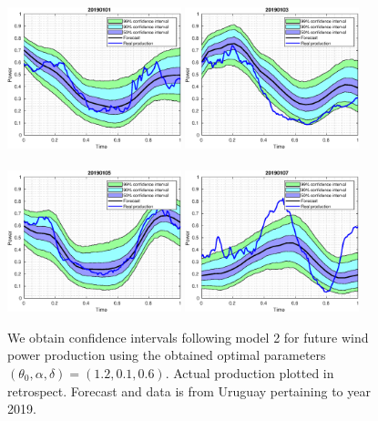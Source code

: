 \documentclass[11pt]{article}
\theoremstyle{definition}
\begin{document}
\begin{figure}[H]
\centering
\includegraphics[width=0.45\textwidth]{../../MATLAB_Files/Results/bands_testing_days/optimal_value/1.eps}
\includegraphics[width=0.45\textwidth]{../../MATLAB_Files/Results/bands_testing_days/optimal_value/2.eps}\\
\quad\\
\includegraphics[width=0.45\textwidth]{../../MATLAB_Files/Results/bands_testing_days/optimal_value/3.eps}
\includegraphics[width=0.45\textwidth]{../../MATLAB_Files/Results/bands_testing_days/optimal_value/4.eps}
\caption{We obtain confidence intervals following model 2  for future wind power production using the obtained optimal parameters $(\theta_0, \alpha ,\delta)=(1.2,0.1,0.6)$. Actual production plotted in retrospect. Forecast and data is from Uruguay pertaining to  year 2019.}
\end{figure}
\end{document}
